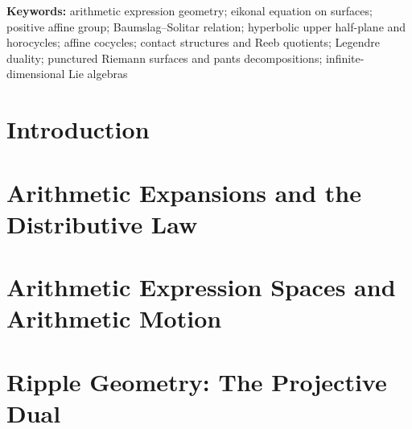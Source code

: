 \documentclass[11pt]{article}
\theoremstyle{definition}
\theoremstyle{remark}
\begin{document}
\begin{abstract}
is the constant $\mu\lambda$ in the bracket
$[D_u,D_v]=\mu\lambda\partial_a$ of the horizontal fields of
$\alpha=da-\mu\,du-\lambda a\,dv$, a contact form whenever $\mu\lambda\ne0$, and
it is the curvature of that horizontal connection; for $\mathfrak E_0$ the
basic model is proved to be the Reeb quotient of the contact model, and
fixed-charge tearing and fixed-state Reeb drift are Legendre dual readings of
the same curvature.  The generators $\partial_a$, $a\partial_a$, and
$a\log a\,\partial_a$ span an infinite-dimensional Lie algebra, so no
finite-dimensional Lie group carries all three ranks, and no observable of the
charge endpoint detects tearing.  For every finite puncture count a conformally
compactifiable punctured AES is constructed, with an explicit four-circle zero
locus and exact reconstruction from three-ended pants blocks.  All results are
elementary, planar, or local to a three-dimensional contact model.
\end{abstract}

\noindent\textbf{Keywords:}
arithmetic expression geometry; eikonal equation on surfaces; positive affine
group; Baumslag--Solitar relation; hyperbolic upper half-plane and horocycles;
affine cocycles; contact structures and Reeb quotients; Legendre duality;
punctured Riemann surfaces and pants decompositions; infinite-dimensional Lie
algebras

\setcounter{tocdepth}{2}
\tableofcontents
\newpage

\section{Introduction}\label{sec:p0-introduction}


\section{Arithmetic Expansions and the Distributive Law}\label{sec:p0-expansion}



\section{Arithmetic Expression Spaces and Arithmetic Motion}\label{sec:p0-aes}


\section{Ripple Geometry: The Projective Dual}\label{sec:p0-ripples}

\end{document}
